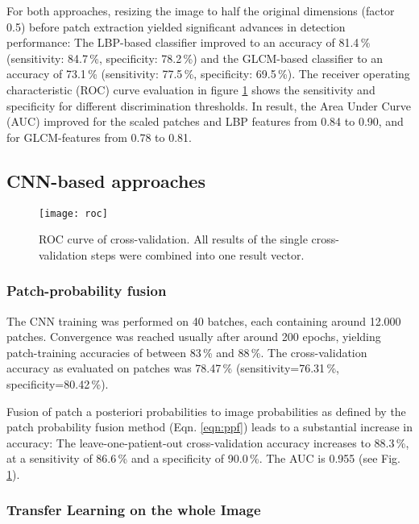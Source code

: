 \documentclass[fleqn,10pt]{wlscirep}
\begin{document}
For both approaches,
resizing the image to half the original dimensions (factor 0.5)
before patch extraction yielded significant advances in detection
performance: The LBP-based classifier improved to an accuracy of
81.4\,\% (sensitivity: 84.7\,\%, specificity: 78.2\,\%) and the
GLCM-based classifier to an accuracy of 73.1\,\% (sensitivity: 77.5\,\%,
specificity: 69.5\,\%). The receiver operating characteristic (ROC) curve evaluation in figure
\ref{fig:roc} shows the sensitivity and specificity for different discrimination thresholds. In result, the Area Under Curve (AUC) improved for the scaled
patches and LBP features from 0.84 to 0.90, and for GLCM-features from
0.78 to 0.81.


\subsection{CNN-based approaches}


\begin{figure}
\centering
\texttt{[image: roc]}
\caption{ROC curve of cross-validation. All results of the single
cross-validation steps were combined into one result vector. }
\label{fig:roc}
\end{figure}

\subsubsection*{Patch-probability fusion}



The CNN training was performed on 40 batches, each containing around 12.000
patches. Convergence was reached usually after around 200 epochs, yielding
patch-training accuracies of between 83\,\% and 88\,\%. The cross-validation accuracy as evaluated on patches was 78.47\,\%
(sensitivity=76.31\,\%, specificity=80.42\,\%).



Fusion of patch a posteriori
probabilities to image probabilities as defined by the patch probability fusion method (Eqn. \ref{eqn:ppf}) leads to a
substantial increase in accuracy: The leave-one-patient-out
cross-validation accuracy increases to 88.3\,\%, at a sensitivity of
86.6\,\% and a specificity of 90.0\,\%. The AUC
is 0.955 (see Fig. \ref{fig:roc}).



\subsubsection*{Transfer Learning on the whole Image}
\end{document}
